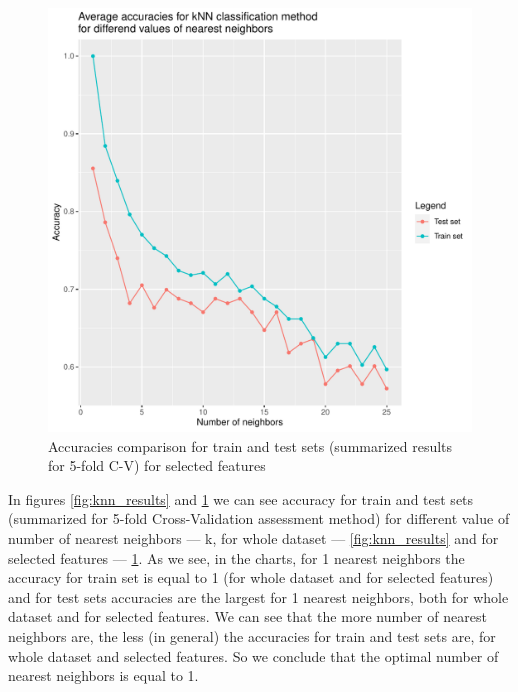 \documentclass[11pt,a4paper]{article}\usepackage[]{graphicx}\usepackage[]{xcolor}
\makeatletter
\def\maxwidth{ %
  \ifdim\Gin@nat@width>\linewidth
    \linewidth
  \else
    \Gin@nat@width
  \fi
}
\newenvironment{knitrout}{}{} %
\makeatother
\begin{document}
\begin{knitrout}
\color{fgcolor}\begin{figure}
\includegraphics[width=\maxwidth]{figure/knn_results2-1} \caption[Accuracies comparison for train and test sets (summarized results for 5-fold C-V) for selected features]{Accuracies comparison for train and test sets (summarized results for 5-fold C-V) for selected features}\label{fig:knn_results2}
\end{figure}

\end{knitrout}

In figures \ref{fig:knn_results} and \ref{fig:knn_results2} we can see accuracy for train and test sets (summarized for 5-fold Cross-Validation assessment method) for different value of number of nearest neighbors --- k, for whole dataset --- \ref{fig:knn_results} and for selected features --- \ref{fig:knn_results2}. As we see, in the charts, for 1 nearest neighbors the accuracy for train set is equal to 1 (for whole dataset and for selected features) and for test sets accuracies are the largest for 1 nearest neighbors, both for whole dataset and for selected features. We can see that the more number of nearest neighbors are, the less (in general) the accuracies for train and test sets are, for whole dataset and selected features. So we conclude that the optimal number of nearest neighbors is equal to 1.
\end{document}
